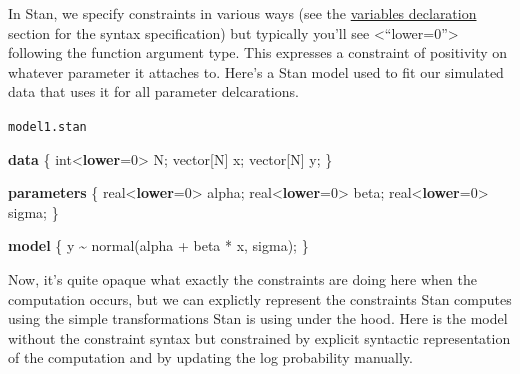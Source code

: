 \documentclass[
  letterpaper,
  DIV=11,
  numbers=noendperiod]{scrartcl}
\newenvironment{Shaded}{\begin{snugshade}}{\end{snugshade}}
\newcommand{\DataTypeTok}[1]{\textcolor[rgb]{0.68,0.00,0.00}{#1}}
\newcommand{\DecValTok}[1]{\textcolor[rgb]{0.68,0.00,0.00}{#1}}
\newcommand{\KeywordTok}[1]{\textcolor[rgb]{0.00,0.23,0.31}{\textbf{#1}}}
\newcommand{\NormalTok}[1]{\textcolor[rgb]{0.00,0.23,0.31}{#1}}
\begin{document}
In Stan, we specify constraints in various ways (see the
\href{https://mc-stan.org/docs/reference-manual/types.html\#variable-declaration.section}{variables
declaration} section for the syntax specification) but typically you'll
see \textless{}``lower=0''\textgreater{} following the function argument
type. This expresses a constraint of positivity on whatever parameter it
attaches to. Here's a Stan model used to fit our simulated data that
uses it for all parameter delcarations.

\begin{codelisting}

\caption{\texttt{model1.stan}}

\begin{Shaded}
\begin{Highlighting}[]
\KeywordTok{data}\NormalTok{ \{}
    \DataTypeTok{int}\NormalTok{\textless{}}\KeywordTok{lower}\NormalTok{=}\DecValTok{0}\NormalTok{\textgreater{} N;}
    \DataTypeTok{vector}\NormalTok{[N] x;}
    \DataTypeTok{vector}\NormalTok{[N] y;}
\NormalTok{\}}

\KeywordTok{parameters}\NormalTok{ \{}
    \DataTypeTok{real}\NormalTok{\textless{}}\KeywordTok{lower}\NormalTok{=}\DecValTok{0}\NormalTok{\textgreater{} alpha;}
    \DataTypeTok{real}\NormalTok{\textless{}}\KeywordTok{lower}\NormalTok{=}\DecValTok{0}\NormalTok{\textgreater{} beta;}
    \DataTypeTok{real}\NormalTok{\textless{}}\KeywordTok{lower}\NormalTok{=}\DecValTok{0}\NormalTok{\textgreater{} sigma; }
\NormalTok{\}}

\KeywordTok{model}\NormalTok{ \{}
\NormalTok{    y \textasciitilde{} normal(alpha + beta * x, sigma);  }
\NormalTok{\}}
\end{Highlighting}
\end{Shaded}

\end{codelisting}

Now, it's quite opaque what exactly the constraints are doing here when
the computation occurs, but we can explictly represent the constraints
Stan computes using the simple transformations Stan is using under the
hood. Here is the model without the constraint syntax but constrained by
explicit syntactic representation of the computation and by updating the
log probability manually.
\end{document}
